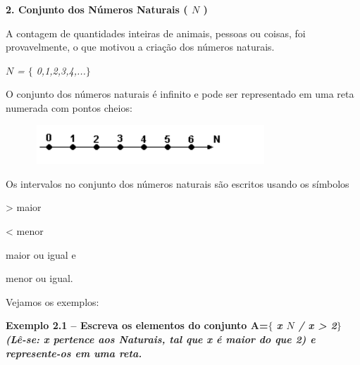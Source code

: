 \documentclass[12pt]{article}
\renewcommand{\_}{\kern-1.5pt\textunderscore\kern-1.5pt}
\begin{document}
\vspace{\baselineskip}
\begin{adjustwidth}{0.37in}{0.0in}
\textbf{2. Conjunto dos Números Naturais ( \( N \) )}\par

\end{adjustwidth}

A contagem de quantidades inteiras de animais, pessoas ou coisas, foi provavelmente, o que motivou a criação dos números naturais.\par

\tab  \( N \) \textit{ = $ \{ $ 0,1,2,3,4,...$ \} $ }\par

O conjunto dos números naturais é infinito e pode ser representado em uma reta numerada com pontos cheios:\par




\begin{figure}[H]
	\begin{Center}
		\includegraphics[width=3.44in,height=0.58in]{./media/image2.pdf}
	\end{Center}
\end{figure}



\par

Os intervalos no conjunto dos números naturais são escritos usando os símbolos \par

> maior \par

< menor \par

 maior ou igual e\par

 menor ou igual.\par

Vejamos os exemplos:\par

\begin{adjustwidth}{0.89in}{0.0in}
\textbf{Exemplo 2.1 – Escreva os elementos do conjunto  A=$ \{ $ \textit{x   \( N \)  / x > 2$ \} $  (Lê-se: x pertence aos Naturais, tal que x é maior do que 2) e represente-os em uma reta.}}\par

\end{adjustwidth}
\end{document}
